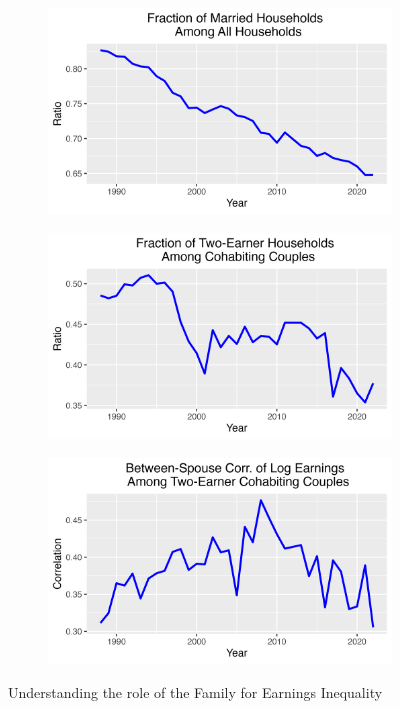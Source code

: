 \documentclass{article}
\begin{document}
\begin{figure}
\begin{subfigure}[t]{0.475\textwidth}
    \end{subfigure}
    \begin{subfigure}[t]{0.475\textwidth}
        \centering
        \includegraphics[width=\textwidth]{figures/Fig_3/Fig_3d_married_ratio.png}
    \end{subfigure}
    \begin{subfigure}[t]{0.475\textwidth}
        \centering
        \includegraphics[width=\textwidth]{figures/Fig_3/Fig_3e_two_earner_ratio.png}
    \end{subfigure}
    \begin{subfigure}[t]{0.475\textwidth}
        \centering
        \includegraphics[width=\textwidth]{figures/Fig_3/Fig_3f_correlation.png}
    \end{subfigure}
    \caption{Understanding the role of the Family for Earnings Inequality}
    \label{fig:Indi_to_HH}
\end{figure}
\end{document}
